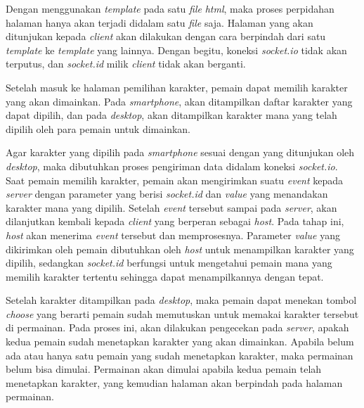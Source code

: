 Dengan menggunakan \textit{template} pada satu \textit{file} \textit{html}, maka proses perpidahan halaman hanya akan terjadi didalam satu \textit{file} saja. Halaman yang akan ditunjukan kepada \textit{client} akan dilakukan dengan cara berpindah dari satu \textit{template} ke \textit{template} yang lainnya. Dengan begitu, koneksi \textit{socket.io} tidak akan terputus, dan \textit{socket.id} milik \textit{client} tidak akan berganti.

Setelah masuk ke halaman pemilihan karakter, pemain dapat memilih karakter yang akan dimainkan. Pada \textit{smartphone}, akan ditampilkan daftar karakter yang dapat dipilih, dan pada \textit{desktop}, akan ditampilkan karakter mana yang telah dipilih oleh para pemain untuk dimainkan.


Agar karakter yang dipilih pada \textit{smartphone} sesuai dengan yang ditunjukan oleh \textit{desktop}, maka dibutuhkan proses pengiriman data didalam koneksi \textit{socket.io}. Saat pemain memilih karakter, pemain akan mengirimkan suatu \textit{event} kepada \textit{server} dengan parameter yang berisi \textit{socket.id} dan \textit{value} yang menandakan karakter mana yang dipilih. Setelah \textit{event} tersebut sampai pada \textit{server}, akan dilanjutkan kembali kepada \textit{client} yang berperan sebagai \textit{host}. Pada tahap ini, \textit{host} akan menerima \textit{event} tersebut dan memprosesnya. Parameter \textit{value} yang dikirimkan oleh pemain dibutuhkan oleh \textit{host} untuk menampilkan karakter yang dipilih, sedangkan \textit{socket.id} berfungsi untuk mengetahui pemain mana yang memilih karakter tertentu sehingga dapat menampilkannya dengan tepat.


Setelah karakter ditampilkan pada \textit{desktop}, maka pemain dapat menekan tombol \textit{choose} yang berarti pemain sudah memutuskan untuk memakai karakter tersebut di permainan. Pada proses ini, akan dilakukan pengecekan pada \textit{server}, apakah kedua pemain sudah menetapkan karakter yang akan dimainkan. Apabila belum ada atau hanya satu pemain yang sudah menetapkan karakter, maka permainan belum bisa dimulai. Permainan akan dimulai apabila kedua pemain telah menetapkan karakter, yang kemudian halaman akan berpindah pada halaman permainan.

